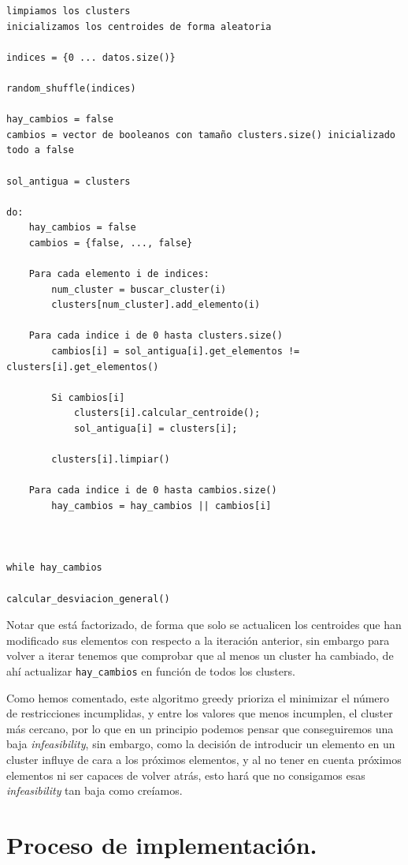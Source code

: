 \documentclass[12pt, spanish]{article}
\begin{document}
\begin{lstlisting}
limpiamos los clusters
inicializamos los centroides de forma aleatoria

indices = {0 ... datos.size()}

random_shuffle(indices)

hay_cambios = false
cambios = vector de booleanos con tamaño clusters.size() inicializado todo a false

sol_antigua = clusters

do:
	hay_cambios = false
	cambios = {false, ..., false}
	
	Para cada elemento i de indices:
		num_cluster = buscar_cluster(i)
		clusters[num_cluster].add_elemento(i)
		
	Para cada indice i de 0 hasta clusters.size()
		cambios[i] = sol_antigua[i].get_elementos != clusters[i].get_elementos()
		
		Si cambios[i]
			clusters[i].calcular_centroide();
			sol_antigua[i] = clusters[i];
			
		clusters[i].limpiar()
		
	Para cada indice i de 0 hasta cambios.size()
		hay_cambios = hay_cambios || cambios[i]



while hay_cambios

calcular_desviacion_general()
\end{lstlisting}

Notar que está factorizado, de forma que solo se actualicen los centroides que han modificado sus elementos con respecto a la iteración anterior, sin embargo para volver a iterar tenemos que comprobar que al menos un cluster ha cambiado, de ahí actualizar \texttt{hay\_cambios} en función de todos los clusters.

Como hemos comentado, este algoritmo greedy prioriza el minimizar el número de restricciones incumplidas, y entre los valores que menos incumplen, el cluster más cercano, por lo que en un principio podemos pensar que conseguiremos una baja \textit{infeasibility}, sin embargo, como la decisión de introducir un elemento en un cluster influye de cara a los próximos elementos, y al no tener en cuenta próximos elementos ni ser capaces de volver atrás, esto hará que no consigamos esas \textit{infeasibility} tan baja como creíamos.

\section{Proceso de implementación.}
\end{document}
